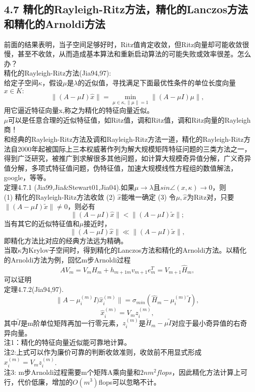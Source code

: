 \documentclass[a4paper,12pt]{article}
\begin{document}
\begin{CJK*}{UTF8}{gbsn}
	\section{4.7 精化的Rayleigh-Ritz方法，精化的Lanczos方法和精化的Arnoldi方法}
	前面的结果表明，当子空间足够好时，Ritz值肯定收敛，但Ritz向量却可能收敛很慢，甚至不收敛，从而造成基本算法和重新启动算法的可能失败或效率很差。怎么办？\\
	精化的Rayleigh-Ritz方法(Jia94,97):\\
	给定子空间$\kappa$，假设$\mu$是$\lambda$的近似值，寻找满足下面最优性条件的单位长度向量$\hat{x} \in K:$
	$$ \|(A-\mu I)\hat{x}\| = \min_{\mu \in \kappa,\|\mu\|=1}\|(A-\mu I)\mu\|, $$
	用它逼近特征向量x,称之为精化的特征向量近似。\\
	$\mu$可以是任意合理的近似特征值，如Ritz值，调和Ritz值，调和Ritz向量的Rayleigh商！\\
	和经典的Rayleigh-Ritz方法及调和Rayleigh-Ritz方法一道，精化的Rayleigh-Ritz方法自2000年起被国际上三本权威著作列为解大规模矩阵特征问题的三类方法之一，得到广泛研究，被推广到求解很多其他问题，如计算大规模奇异值分解，广义奇异值分解，多项式特征值问题，伪特征值，加速大规模线性方程组的数值解法，google，等等。\\
	定理4.7.1 (Jia99,Jia\&Stewart01,Jia04).如果$\mu \to \lambda$且$sin\angle(x,\kappa)\to 0$，则\\
	(1) 精化的Rayleigh-Ritz方法收敛
	(2) $\hat{x}$能唯一确定
	(3) 令$\mu,\hat{x}$为Ritz对，只要$\|(A-\mu I)\tilde{x}\| \ne 0$，则必有
	$$ \|(A-\mu I)\hat{x}\| < \|(A-\mu I)\tilde{x}\|; $$
	当有其它的近似特征值和$\mu$接近时，
	$$ \|(A-\mu I)\hat{x}\| \ll \|(A-\mu I)\tilde{x}\|, $$
	即精化方法比对应的经典方法远为精确。\\
	当取$\kappa$为Krylov子空间时，得到精化的Lanczos方法和精化的Arnoldi方法。以精化的Arnoldi方法为例，回忆m步Arnoldi过程
	$$ AV_m = V_mH_m + h_{m+1m}v_{m+1}e_m^T = V_{m+1}\hat{H}_m,$$
	可以证明\\
	定理4.7.2(Jia94,97).
	$$ \|A-\mu_i^{(m)}I)\hat{x}_i^{(m)}\| = \sigma_{min}(\hat{H}_m - \mu_i^{(m)}\tilde{I}),$$
	$$ \hat{x}_i^{(m)} = V_mz_i^{(m)},$$
	其中$\tilde{I}$是m阶单位矩阵再加一行零元素，$z_i^{(m)}$是$\tilde{H}_m - \mu \tilde{I}$对应于最小奇异值的右奇异向量。\\
	注1：精化的特征向量近似能可靠地计算。\\
	注2:上式可以作为廉价可靠的判断收敛准则，收敛前不用显式形成$\hat{x}_i^{(m)} = V_mz_i^{(m)}$.\\
	注3: m步Arnoldi过程需要m个矩阵A乘向量和$2nm^2flops$，因此精化方法计算上可行，代价低廉，增加的$O(m^3)$flops可以忽略不计。\\

\end{CJK*}
\end{document}
